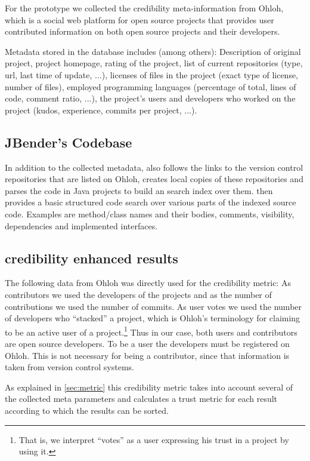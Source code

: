 For the \Jbd prototype we collected the credibility meta-information from Ohloh, which is a social web platform for open source projects that provides user contributed information on both open source projects and their developers.

Metadata stored in the database includes (among others): Description of original project, project homepage, rating of the project, list of current repositories (type, url, last time of update, ...), licenses of files in the project (exact type of license, number of files), employed programming languages (percentage of total, lines of code, comment ratio, ...), the project's users and developers who worked on the project (kudos, experience, commits per project, ...).

\subsection{JBender's Codebase}
In addition to the collected metadata, \Jbd also follows the links to the version control repositories that are listed on Ohloh, creates local copies of these repositories and parses the code in Java projects to build an search index over them.
\Jbd then provides a basic structured code search over various parts of the indexed source code. Examples are method/class names and their bodies, comments, visibility, dependencies and implemented interfaces.

\subsection{credibility enhanced results}

The following data from Ohloh was directly used for the credibility metric: As contributors we used the developers of the projects and as the number of contributions we used the number of commits. As user votes we used the number of developers who ``stacked'' a project, which is Ohloh's terminology for claiming to be an active user of a project.\footnote{That is, we interpret ``votes'' as a user expressing his trust in a project by using it.} Thus in our case, both users and contributors are open source developers. To be a user the developers must be registered on Ohloh.  This is not necessary for being a contributor, since that information is taken from version control systems.

As explained in \autoref{sec:metric} this credibility metric takes into account several of the collected meta parameters and calculates a trust metric for each result according to which the results can be sorted.

